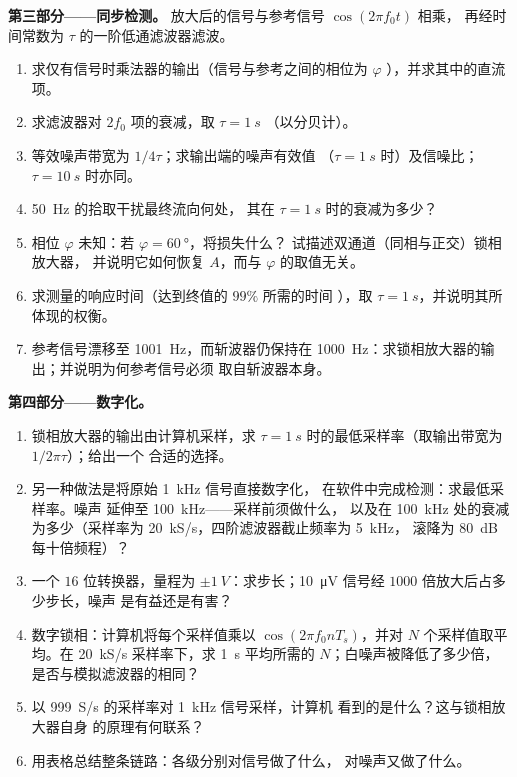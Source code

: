 \begin{problem}
\medskip
\noindent\textbf{第三部分——同步检测。}
放大后的信号与参考信号 $\cos(2\pi f_0t)$ 相乘，
再经时间常数为 $\tau$ 的一阶低通滤波器滤波。
\begin{enumerate}[resume]
  \item 求仅有信号时乘法器的输出（信号与参考之间的相位为 $\varphi$
        ），并求其中的直流项。
  \item 求滤波器对 $2f_0$ 项的衰减，取 $\tau = \qty{1}{s}$
        （以分贝计）。
  \item 等效噪声带宽为 $1/4\tau$；求输出端的噪声有效值
        （$\tau = \qty{1}{s}$ 时）及信噪比；$\tau = \qty{10}{s}$ 时亦同。
  \item \qty{50}{Hz} 的拾取干扰最终流向何处，
        其在 $\tau = \qty{1}{s}$ 时的衰减为多少？
  \item 相位 $\varphi$ 未知：若 $\varphi = \qty{60}{\degree}$，将损失什么？
        试描述双通道（同相与正交）锁相放大器，
        并说明它如何恢复 $A$，而与 $\varphi$ 的取值无关。
  \item 求测量的响应时间（达到终值的 $99\%$ 所需的时间
        ），取 $\tau = \qty{1}{s}$，并说明其所体现的权衡。
  \item 参考信号漂移至 \qty{1001}{Hz}，而斩波器仍保持在
        \qty{1000}{Hz}：求锁相放大器的输出；并说明为何参考信号必须
        取自斩波器本身。
\end{enumerate}

\medskip
\noindent\textbf{第四部分——数字化。}
\begin{enumerate}[resume]
  \item 锁相放大器的输出由计算机采样，求
        $\tau = \qty{1}{s}$ 时的最低采样率（取输出带宽为 $1/2\pi\tau$）；给出一个
        合适的选择。
  \item 另一种做法是将原始 \qty{1}{kHz} 信号直接数字化，
        在软件中完成检测：求最低采样率。噪声
        延伸至 \qty{100}{kHz}——采样前须做什么，
        以及在 \qty{100}{kHz} 处的衰减为多少（采样率为
        \qty{20}{kS/s}，四阶滤波器截止频率为 \qty{5}{kHz}，
        滚降为 \qty{80}{dB} 每十倍频程）？
  \item 一个 $16$ 位转换器，量程为 $\pm\qty{1}{V}$：求步长；\qty{10}{\micro V}
        信号经 $1000$ 倍放大后占多少步长，噪声
        是有益还是有害？
  \item 数字锁相：计算机将每个采样值乘以
        $\cos(2\pi f_0nT_s)$，并对 $N$ 个采样值取平均。在 \qty{20}{kS/s}
        采样率下，求 \qty{1}{s} 平均所需的 $N$；白噪声被降低了多少倍，
        是否与模拟滤波器的相同？
  \item 以 \qty{999}{S/s} 的采样率对 \qty{1}{kHz} 信号采样，计算机
        看到的是什么？这与锁相放大器自身
        的原理有何联系？
  \item 用表格总结整条链路：各级分别对信号做了什么，
        对噪声又做了什么。
\end{enumerate}
\end{problem}
